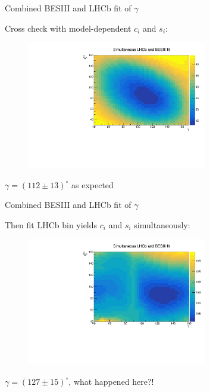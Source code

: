 \documentclass{beamer}
\begin{document}
\begin{frame}{Combined BESIII and LHCb fit of $\gamma$}
  \begin{center}
    {\large Cross check with model-dependent $c_i$ and $s_i$:}
  \end{center}
  \begin{figure}
    \includegraphics[width=0.7\textwidth]{Plots/Contours_gamma_deltaB_ModelDependent_Scan.pdf}
  \end{figure}
  \begin{center}
    {\large $\gamma = (112 \pm 13)^\circ$ as expected}
  \end{center}
\end{frame}

\begin{frame}{Combined BESIII and LHCb fit of $\gamma$}
  \begin{center}
    {\large Then fit LHCb bin yields $c_i$ and $s_i$ simultaneously:}
  \end{center}
  \begin{figure}
    \includegraphics[width=0.7\textwidth]{Plots/Contours_gamma_deltaB_ModelIndependent_Scan.pdf}
  \end{figure}
  \begin{center}
    {\large $\gamma = (127 \pm 15)^\circ$, what happened here?!}
  \end{center}
\end{frame}
\end{document}
